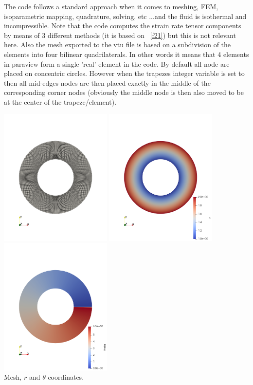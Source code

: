 The code follows a standard approach when it comes to meshing, FEM, isoparametric
mapping, quadrature, solving, etc ...and the fluid is isothermal and incompressible.
Note that the code computes the strain rate tensor components by means of 3 different 
methods (it is based on \stone~\ref{f21}) but this is not relevant here.
Also the mesh exported to the vtu file is based on a subdivision of the elements into 
four bilinear quadrilaterals. In other words it means that 4 elements in paraview 
form a single 'real' element in the code.
By default all node are placed on concentric circles. However when the {\python trapezes}
integer variable is set to {} then all mid-edges nodes are then placed exactly in the middle of the 
corresponding corner nodes (obviously the middle node is then also 
moved to be at the center of the trapeze/element).

\begin{center}
\includegraphics[width=5.6cm]{./python_codes/fieldstone_151/images/mesh}
\includegraphics[width=5.6cm]{./python_codes/fieldstone_151/images/r}
\includegraphics[width=5.6cm]{./python_codes/fieldstone_151/images/theta}\\
{\captionfont Mesh, $r$ and $\theta$ coordinates.}
\end{center}

